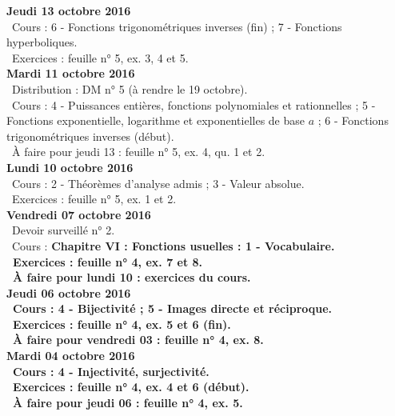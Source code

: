 \documentclass[12pt,a4paper]{article}
\begin{document}
\noindent\textbf{Jeudi 13 octobre 2016}\\
\bu\ Cours :  6 - Fonctions trigonométriques inverses (fin) ; 7 - Fonctions hyperboliques.\\
\bu\ Exercices : feuille n° 5, ex. 3, 4 et 5.\vspace{.4cm}\\

\noindent\textbf{\bf Mardi 11 octobre 2016}\\
\bu\ Distribution : DM n° 5 (à rendre le 19 octobre).\\
\bu\ Cours : 4 - Puissances entières, fonctions 
polynomiales et rationnelles ; 5 - Fonctions exponentielle, logarithme et 
exponentielles de base $a$ ; 6 - Fonctions trigonométriques inverses (début).\\
\bu\ À faire pour jeudi 13 : feuille n° 5, ex. 4, qu. 1 et 2.\vspace{.4cm}\\

\noindent\textbf{Lundi 10 octobre 2016}\\
\bu\ Cours :  2 - Théorèmes d'analyse admis ; 3 - Valeur absolue.\\
\bu\ Exercices : feuille n° 5, ex. 1 et 2.\vspace{.4cm}\\
   
\noindent\textbf{Vendredi 07 octobre 2016}\\
\bu\ Devoir surveillé n° 2.\\
\bu\ Cours : \bf Chapitre VI \rm : Fonctions usuelles : 1 - Vocabulaire.\\
\bu\ Exercices : feuille n° 4, ex. 7 et 8.\\
\bu\ À faire pour lundi 10 : exercices du cours.\vspace{.4cm}\\

\noindent\textbf{Jeudi 06 octobre 2016}\\
\bu\ Cours : 4 - Bijectivité ; 5 - Images directe et réciproque.\\
\bu\ Exercices : feuille n° 4, ex. 5 et 6 (fin).\\
\bu\ À faire pour vendredi 03 : feuille n° 4, ex. 8.\vspace{.4cm}\\

\noindent\textbf{\bf Mardi 04 octobre 2016}\\
\bu\ Cours : 4 - Injectivité, surjectivité.\\
\bu\ Exercices : feuille n° 4, ex. 4 et 6 (début).\\
\bu\ À faire pour jeudi 06 : feuille n° 4, ex. 5.\vspace{.4cm}\\
\end{document}
